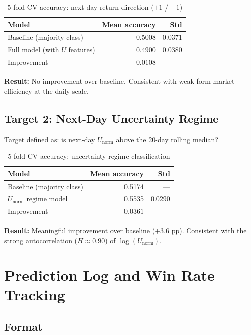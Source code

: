 \documentclass[preprint,12pt]{elsarticle}
\begin{document}
\begin{table}[htbp]
\centering
\caption{5-fold CV accuracy: next-day return direction ($+1$ / $-1$)}
\begin{tabular}{lrr}
\toprule
Model & Mean accuracy & Std \\
\midrule
Baseline (majority class) & 0.5008 & 0.0371 \\
Full model (with $U$ features) & 0.4900 & 0.0380 \\
Improvement & $-0.0108$ & --- \\
\bottomrule
\end{tabular}
\end{table}

\textbf{Result:} No improvement over baseline. Consistent with weak-form market efficiency at the daily scale.

\subsection{Target 2: Next-Day Uncertainty Regime}

Target defined as: is next-day $U_\mathrm{norm}$ above the 20-day rolling median?

\begin{table}[htbp]
\centering
\caption{5-fold CV accuracy: uncertainty regime classification}
\begin{tabular}{lrr}
\toprule
Model & Mean accuracy & Std \\
\midrule
Baseline (majority class) & 0.5174 & --- \\
$U_\mathrm{norm}$ regime model & 0.5535 & 0.0290 \\
Improvement & $+0.0361$ & --- \\
\bottomrule
\end{tabular}
\end{table}

\textbf{Result:} Meaningful improvement over baseline ($+3.6$ pp). Consistent with the strong autocorrelation ($H \approx 0.90$) of $\log(U_\mathrm{norm})$.

\section{Prediction Log and Win Rate Tracking}

\subsection{Format}
\end{document}
